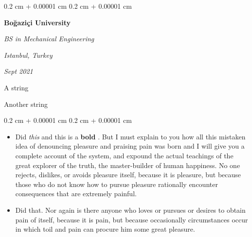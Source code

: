\documentclass[10pt, letterpaper]{article}
\newenvironment{summary}{
    \begin{description}[
        topsep=0.10 cm,
        parsep=0.10 cm,
        partopsep=0pt,
        itemsep=0pt,
        leftmargin=0.4 cm + 10pt
    ]
}{
    \end{description}
} %
\newenvironment{highlights}{
    \begin{itemize}[
        topsep=0.10 cm,
        parsep=0.10 cm,
        partopsep=0pt,
        itemsep=0pt,
        leftmargin=0.4 cm + 10pt
    ]
}{
    \end{itemize}
} %
\newenvironment{onecolentry}{
    \begin{adjustwidth}{
        0.2 cm + 0.00001 cm
    }{
        0.2 cm + 0.00001 cm
    }
}{
    \end{adjustwidth}
} %
\newenvironment{twocolentry}[2][]{
    \onecolentry
    \def\secondColumn{#2}
    \setcolumnwidth{\fill, 4.5 cm}
    \begin{paracol}{2}
}{
    \switchcolumn \raggedleft \secondColumn
    \end{paracol}
    \endonecolentry
} %
\let\hrefWithoutArrow\href
\renewcommand{\href}[2]{\hrefWithoutArrow{#1}{\ifthenelse{\equal{#2}{}}{ }{#2 }\raisebox{.15ex}{\footnotesize \faExternalLink*}}}
\begin{document}
        \begin{twocolentry}{
        \textit{Istanbul, Turkey}    
            
        \textit{Sept 2021}}
            \textbf{Boğaziçi University}

            \textit{BS in Mechanical Engineering}
        \end{twocolentry}
            \begin{summary}
                \item A string
                \item Another string
            \end{summary}
        \vspace{0.10 cm}
        \begin{onecolentry}
            \begin{highlights}
                \item Did \textit{this} and this is a \textbf{bold} \href{https://example.com}{link}. But I must explain to you how all this mistaken idea of denouncing pleasure and praising pain was born and I will give you a complete account of the system, and expound the actual teachings of the great explorer of the truth, the master-builder of human happiness. No one rejects, dislikes, or avoids pleasure itself, because it is pleasure, but because those who do not know how to pursue pleasure rationally encounter consequences that are extremely painful.
                \item Did that. Nor again is there anyone who loves or pursues or desires to obtain pain of itself, because it is pain, but because occasionally circumstances occur in which toil and pain can procure him some great pleasure.
            \end{highlights}
        \end{onecolentry}


        \vspace{0.2 cm}
\end{document}
